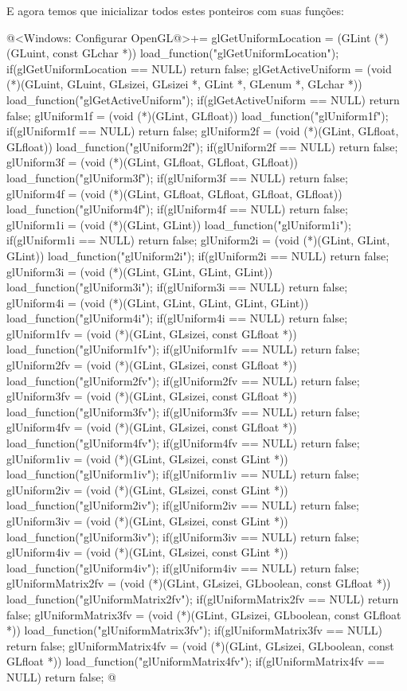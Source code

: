 E agora temos que inicializar todos estes ponteiros com suas funções:

\iniciocodigo
@<Windows: Configurar OpenGL@>+=
glGetUniformLocation = (GLint (*)(GLuint, const GLchar *))
                            load_function("glGetUniformLocation");
if(glGetUniformLocation == NULL) return false;
glGetActiveUniform = (void (*)(GLuint, GLuint, GLsizei, GLsizei *, GLint *,
                      GLenum *, GLchar *)) load_function("glGetActiveUniform");
if(glGetActiveUniform == NULL) return false;
glUniform1f = (void (*)(GLint, GLfloat)) load_function("glUniform1f");
if(glUniform1f == NULL) return false;
glUniform2f = (void (*)(GLint, GLfloat, GLfloat)) load_function("glUniform2f");
if(glUniform2f == NULL) return false;
glUniform3f = (void (*)(GLint, GLfloat, GLfloat, GLfloat))
                        load_function("glUniform3f");
if(glUniform3f == NULL) return false;
glUniform4f = (void (*)(GLint, GLfloat, GLfloat, GLfloat, GLfloat))
                        load_function("glUniform4f");
if(glUniform4f == NULL) return false;
glUniform1i = (void (*)(GLint, GLint)) load_function("glUniform1i");
if(glUniform1i == NULL) return false;
glUniform2i = (void (*)(GLint, GLint, GLint)) load_function("glUniform2i");
if(glUniform2i == NULL) return false;
glUniform3i = (void (*)(GLint, GLint, GLint, GLint)) load_function("glUniform3i");
if(glUniform3i == NULL) return false;
glUniform4i = (void (*)(GLint, GLint, GLint, GLint, GLint))
                 load_function("glUniform4i");
if(glUniform4i == NULL) return false;
glUniform1fv = (void (*)(GLint, GLsizei, const GLfloat *))
                 load_function("glUniform1fv");
if(glUniform1fv == NULL) return false;
glUniform2fv = (void (*)(GLint, GLsizei, const GLfloat *))
                 load_function("glUniform2fv");
if(glUniform2fv == NULL) return false;
glUniform3fv = (void (*)(GLint, GLsizei, const GLfloat *))
                 load_function("glUniform3fv");
if(glUniform3fv == NULL) return false;
glUniform4fv = (void (*)(GLint, GLsizei, const GLfloat *))
                 load_function("glUniform4fv");
if(glUniform4fv == NULL) return false;
glUniform1iv = (void (*)(GLint, GLsizei, const GLint *))
                 load_function("glUniform1iv");
if(glUniform1iv == NULL) return false;
glUniform2iv = (void (*)(GLint, GLsizei, const GLint *))
                 load_function("glUniform2iv");
if(glUniform2iv == NULL) return false;
glUniform3iv = (void (*)(GLint, GLsizei, const GLint *))
                 load_function("glUniform3iv");
if(glUniform3iv == NULL) return false;
glUniform4iv = (void (*)(GLint, GLsizei, const GLint *))
                 load_function("glUniform4iv");
if(glUniform4iv == NULL) return false;
glUniformMatrix2fv = (void (*)(GLint, GLsizei, GLboolean, const GLfloat *))
                      load_function("glUniformMatrix2fv");
if(glUniformMatrix2fv == NULL) return false;
glUniformMatrix3fv = (void (*)(GLint, GLsizei, GLboolean, const GLfloat *))
                      load_function("glUniformMatrix3fv");
if(glUniformMatrix3fv == NULL) return false;
glUniformMatrix4fv = (void (*)(GLint, GLsizei, GLboolean, const GLfloat *))
                      load_function("glUniformMatrix4fv");
if(glUniformMatrix4fv == NULL) return false;
@
\fimcodigo

